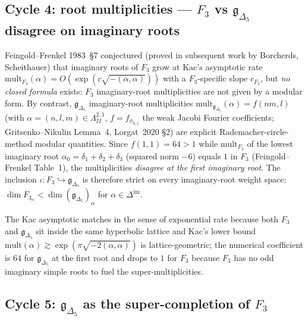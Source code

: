 \documentclass[12pt]{article}
\providecommand{\gDelta}{\mathfrak{g}_{\Delta_5}}
\providecommand{\FF}{F_3}
\providecommand{\LambII}{\Lambda^{2,1}_{II}}
\providecommand{\Dim}{\Delta^{\mathrm{im}}}
\begin{document}
\subsection*{Cycle 4: root multiplicities --- $F_3$ vs $\gDelta$ disagree on imaginary roots}

Feingold--Frenkel 1983~\S 7 conjectured (proved in subsequent
work by Borcherds, Scheithauer) that imaginary roots of $\FF$
grow at Kac's asymptotic rate
$\mathrm{mult}_{\FF}(\alpha) = O(\exp(c \sqrt{-(\alpha,\alpha)}))$
with a $\FF$-specific slope $c_{\FF}$, but \emph{no closed formula}
exists: $\FF$ imaginary-root multiplicities are not given by a
modular form. By contrast, $\gDelta$ imaginary-root multiplicities
$\mathrm{mult}_{\gDelta}(\alpha) = f(nm,l)$ (with $\alpha =
(n,l,m) \in \LambII$, $f = f_{\phi_{0,1}}$ the weak Jacobi
Fourier coefficients; Gritsenko--Nikulin Lemma~4, Lorgat~2020
\S 2) are explicit Rademacher-circle-method modular quantities.
Since $f(1,1) = 64 > 1$ while $\mathrm{mult}_{\FF}$ of the
lowest imaginary root $\alpha_0 = \delta_1 + \delta_2 + \delta_3$
(squared norm $-6$) equals $1$ in $\FF$ (Feingold--Frenkel
Table~1), the multiplicities \emph{disagree at the first
imaginary root}. The inclusion $\iota\colon \FF \hookrightarrow
\gDelta$ is therefore strict on every imaginary-root weight
space: $\dim \FF_\alpha < \dim (\gDelta)_\alpha$ for
$\alpha \in \Dim$.

The Kac asymptotic matches in the sense of exponential rate
because both $\FF$ and $\gDelta$ sit inside the same hyperbolic
lattice and Kac's lower bound
$\mathrm{mult}(\alpha) \gtrsim \exp(\pi\sqrt{-2(\alpha,\alpha)})$
is lattice-geometric; the numerical coefficient is $64$ for
$\gDelta$ at the first root and drops to $1$ for $\FF$ because
$\FF$ has no odd imaginary simple roots to fuel the
super-multiplicities.

\subsection*{Cycle 5: $\gDelta$ as the super-completion of $\FF$}
\end{document}
